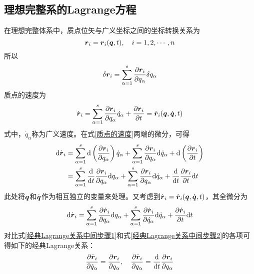 \subsection{理想完整系的Lagrange方程}

在理想完整体系中，质点位矢与广义坐标之间的坐标转换关系为
\begin{equation*}
	\boldsymbol{r}_i = \boldsymbol{r}_i(\boldsymbol{q},t),\quad i=1,2,\cdots,n
\end{equation*}
所以
\begin{equation*}
	\delta \boldsymbol{r}_i = \sum_{\alpha=1}^s \frac{\partial \boldsymbol{r}_i}{\partial q_\alpha} \delta q_\alpha
\end{equation*}
质点的速度为
\begin{equation}
	\dot{\boldsymbol{r}}_i = \sum_{\alpha=1}^s \frac{\partial \boldsymbol{r}_i}{\partial q_\alpha} \dot{q}_\alpha + \frac{\partial \boldsymbol{r}_i}{\partial t} = \dot{\boldsymbol{r}}_i(\boldsymbol{q},\dot{\boldsymbol{q}},t)
	\label{质点的速度}
\end{equation}
式中，$\dot{q}_\alpha$称为{\heiti 广义速度}。在式\eqref{质点的速度}两端的微分，可得
\begin{align}
	\mathrm{d} \dot{\boldsymbol{r}}_i & = \sum_{\alpha=1}^s \mathrm{d} \left(\frac{\partial \boldsymbol{r}_i}{\partial q_\alpha}\right) \dot{q}_\alpha + \sum_{\alpha=1}^s \frac{\partial \boldsymbol{r}_i}{\partial q_\alpha} \mathrm{d} \dot{q}_\alpha + \mathrm{d} \left(\frac{\partial \boldsymbol{r}_i}{\partial t}\right) \nonumber \\
	& = \sum_{\alpha=1}^s \frac{\mathrm{d}}{\mathrm{d} t} \frac{\partial \boldsymbol{r}_i}{\partial q_\alpha} \mathrm{d} q_\alpha + \sum_{\alpha=1}^s \frac{\partial \boldsymbol{r}_i}{\partial q_\alpha} \mathrm{d} \dot{q}_\alpha + \frac{\mathrm{d}}{\mathrm{d} t} \frac{\partial \boldsymbol{r}_i}{\partial t} \mathrm{d} t
	\label{经典Lagrange关系中间步骤1}
\end{align}
此处将$\boldsymbol{q}$和$\dot{\boldsymbol{q}}$作为相互独立的变量来处理。又考虑到$\dot{\boldsymbol{r}}_i = \dot{\boldsymbol{r}}_i(\boldsymbol{q},\dot{\boldsymbol{q}},t)$，其全微分为
\begin{equation}
	\mathrm{d} \dot{\boldsymbol{r}}_i = \sum_{\alpha=1}^s \frac{\partial \dot{\boldsymbol{r}}_i}{\partial q_\alpha} \mathrm{d} q_\alpha + \sum_{\alpha=1}^s \frac{\partial \dot{\boldsymbol{r}}_i}{\partial \dot{q}_\alpha} \mathrm{d} \dot{q}_\alpha + \frac{\partial \dot{\boldsymbol{r}}_i}{\partial t} \mathrm{d} t
	\label{经典Lagrange关系中间步骤2}
\end{equation}
对比式\eqref{经典Lagrange关系中间步骤1}和式\eqref{经典Lagrange关系中间步骤2}的各项可得如下的{\heiti 经典Lagrange关系}：
\begin{equation}
	\frac{\partial \dot{\boldsymbol{r}}_i}{\partial \dot{q}_\alpha} = \frac{\partial \boldsymbol{r}_i}{\partial q_\alpha},\quad \frac{\partial \dot{\boldsymbol{r}}_i}{\partial q_\alpha} = \frac{\mathrm{d}}{\mathrm{d} t} \frac{\partial \boldsymbol{r}_i}{\partial q_\alpha}
	\label{经典Lagrange关系}
\end{equation}
